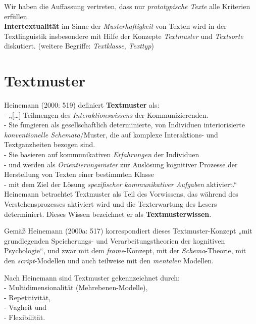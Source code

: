 \documentclass[
  letterpaper,
]{scrbook}
\begin{document}
Wir haben die Auffassung vertreten, dass nur \emph{prototypische Texte}
alle Kriterien erfüllen.\\

\textbf{Intertextualität} im Sinne der \emph{Musterhaftigkeit} von
Texten wird in der Textlinguistik insbesondere mit Hilfe der Konzepte
\emph{Textmuster} und \emph{Textsorte} diskutiert. (weitere Begriffe:
\emph{Textklasse}, \emph{Texttyp})

\hypertarget{textmuster}{%
\section{Textmuster}\label{textmuster}}

Heinemann (2000: 519) definiert \textbf{Textmuster} als:\\
- „{[}\ldots{]} Teilmengen des \emph{Interaktionswissens} der
Kommunizierenden.\\
- Sie fungieren als gesellschaftlich determinierte, von Individuen
interiorisierte \emph{konventionelle Schemata}/Muster, die auf komplexe
Interaktions- und Textganzheiten bezogen sind.\\
- Sie basieren auf kommunikativen \emph{Erfahrungen} der Individuen\\
- und werden als \emph{Orientierungsraster} zur Auslösung kognitiver
Prozesse der Herstellung von Texten einer bestimmten Klasse\\
- mit dem Ziel der Lösung \emph{spezifischer kommunikativer Aufgaben}
aktiviert.``\\

Heinemann betrachtet Textmuster als Teil des Vorwissens, das während des
Verstehensprozesses aktiviert wird und die Texterwartung des Lesers
determiniert. Dieses Wissen bezeichnet er als \textbf{Textmusterwissen}.

Gemäß Heinemann (2000a: 517) korrespondiert dieses Textmuster-Konzept
„mit grundlegenden Speicherungs- und Verarbeitungstheorien der
kognitiven Psychologie``, und zwar mit dem \emph{frame}-Konzept, mit der
\emph{Schema}-Theorie, mit den \emph{script}-Modellen und auch teilweise
mit den \emph{mentalen} Modellen.

Nach Heinemann sind Textmuster gekennzeichnet durch:\\
- Multidimensionalität (Mehrebenen-Modelle),\\
- Repetitivität,\\
- Vagheit und\\
- Flexibilität.\\
\end{document}

